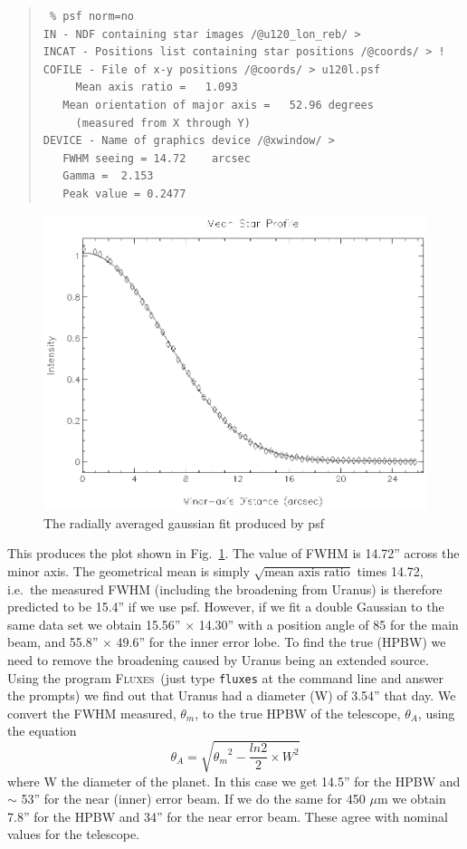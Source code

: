 \documentclass[twoside,11pt]{article}
\newenvironment{myquote}{\begin{quote}\begin{small}}{\end{small}\end{quote}}
\newcommand{\fluxes}{\xref{\textsc{Fluxes}}{sun213}{}}
\newcommand{\task}[1]{\textsf{#1}}
\newcommand{\psf}{\xref{\task{psf}}{sun95}{PSF}}
\newcommand{\xref}[3]{#1}
\renewcommand{\_}{\texttt{\symbol{95}}}
\begin{document}
\begin{myquote}
\begin{verbatim}
 % psf norm=no
IN - NDF containing star images /@u120_lon_reb/ > 
INCAT - Positions list containing star positions /@coords/ > !
COFILE - File of x-y positions /@coords/ > u120l.psf
     Mean axis ratio =   1.093
   Mean orientation of major axis =   52.96 degrees
     (measured from X through Y)
DEVICE - Name of graphics device /@xwindow/ > 
   FWHM seeing = 14.72    arcsec
   Gamma =  2.153
   Peak value = 0.2477
\end{verbatim}
\end{myquote}

\begin{figure}
\begin{center}
\includegraphics[width=5.5in]{sc11_fig12.eps}
\caption{The radially averaged gaussian fit produced by \psf}
\label{fig:psf}
\end{center}
\end{figure}


This produces the plot shown in Fig.\ \ref{fig:psf}.  The value of FWHM is
14.72'' across the minor axis.  The geometrical mean is simply
$\sqrt{\mbox{mean axis ratio}}$ times 14.72, i.e.\ the measured FWHM
(including the broadening from Uranus) is therefore predicted to be 15.4'' if
we use \psf.  However, if we fit a double Gaussian to the same data set we
obtain 15.56'' $\times$ 14.30'' with a position angle of 85 for the main beam,
and 55.8'' $\times$ 49.6'' for the inner error lobe.  To find the true (HPBW)
we need to remove the broadening caused by Uranus being an extended source.
Using the program \fluxes\ (just type \texttt{fluxes} at the command line and
answer the prompts) we find out that Uranus had a diameter (W) of 3.54'' that
day.  We convert the FWHM measured, $\theta_m$, to the true HPBW of the
telescope, $\theta_{A}$, using the equation \begin{equation} \theta_{A} =
  \sqrt{{\theta_m}^{2} - \frac{ln2}{2} \times W^{2} } \end{equation} where W
the diameter of the planet.  In this case we get 14.5'' for the HPBW and
$\sim$ 53'' for the near (inner) error beam.  If we do the same for 450 $\mu$m
we obtain 7.8'' for the HPBW and 34'' for the near error beam.  These agree
with nominal values for the telescope.
\end{document}
